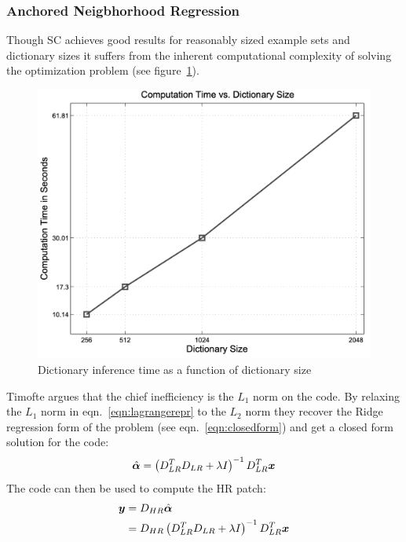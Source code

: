 \subsubsection{Anchored Neigbhorhood Regression}
Though SC achieves good results for reasonably sized example sets and dictionary sizes it suffers from the inherent computational complexity of solving the optimization problem (see figure~\ref{fig:dictspeedspize}).
\begin{figure}
	\centering
	\includegraphics[width=\linewidth,keepaspectratio]{figures/classical/dictsizespeed.png}
	\caption{Dictionary inference time as a function of dictionary size\cite{yang2010}}
	\label{fig:dictspeedspize}
\end{figure}
%
Timofte \etal\cite{Timofte} argues that the chief inefficiency is the $L_1$ norm on the code.
%
By relaxing the $L_1$ norm in eqn.~\eqref{eqn:lagrangerepr} to the $L_2$ norm they recover the Ridge regression form of the problem (see eqn.~\eqref{eqn:closedform}) and get a closed form solution for the code:
\begin{equation}
	\hat{\bm{\alpha}} = \left( D_{LR}^T D_{LR} + \lambda I\right)^{-1}D_{LR}^T \bm{x}
\end{equation}
The code can then be used to compute the HR patch:
\begin{align}
	\by & = D_{HR} \hat{\bm{\alpha}}                                                               \\
	    & = D_{HR} \left( D_{LR}^T D_{LR} + \lambda I\right)^{-1}D_{LR}^T \label{eqn:mappinglr}\bx
\end{align}
